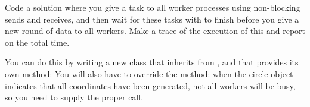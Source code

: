  Code a  solution where you give a task to all worker processes
  using non-blocking sends and receives, and then wait for these tasks
  with 
  to finish before you give a new round of data to all workers.
  Make a trace of the execution of this and report on the total time.

  You can do this by writing a new class that inherits from ,
  and that provides its own  method:
  You will also have to override the  method: when the circle
  object indicates that all coordinates have been generated, not all
  workers will be busy, so you need to supply the proper 
  call.
